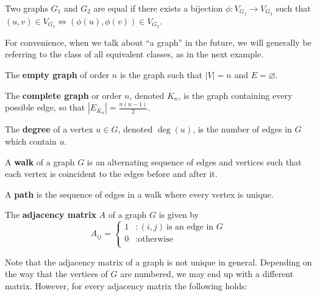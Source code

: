 \begin{definition}
  Two graphs $G_1$ and $G_2$ are equal if there exists a bijection $\phi :
  V_{G_1} \to V_{G_2}$ such that $(u,v) \in V_{G_1} \Leftrightarrow
  (\phi(u),\phi(v)) \in V_{G_2}$.
\end{definition}

For convenience, when we talk about ``a graph'' in the future, we will generally
be referring to the class of all equivalent classes, as in the next example.

\begin{example}
  The \textbf{empty graph} of order $n$ is the graph such that $|V| = n$ and $E
  = \varnothing$.

  The \textbf{complete graph} or order $n$, denoted $K_n$, is the graph
  containing every possible edge, so that $|E_{K_n}| = \frac{n(n-1)}{2}$.
\end{example}

\begin{definition}
  The \textbf{degree} of a vertex $u \in G$, denoted $\deg (u)$, is the number
  of edges in $G$ which contain $u$.
\end{definition}

\begin{definition}
  A \textbf{walk} of a graph $G$ is an alternating sequence of edges and
  vertices such that each vertex is coincident to the edges before and after it.

  A \textbf{path} is the sequence of edges in a walk where every vertex is
  unique.
\end{definition}

\begin{definition}
  The \textbf{adjacency matrix} $A$ of a graph $G$ is given by
  \[
    A_{ij} = \begin{cases}
      1 &: (i,j) ~\text{is an edge in $G$} \\
      0 &: \text{otherwise} \\
    \end{cases}
  \]
\end{definition}


Note that the adjacency matrix of a graph is not unique in general. Depending on
the way that the vertices of $G$ are numbered, we may end up with a different
matrix. However, for every adjacency matrix the following holds:


